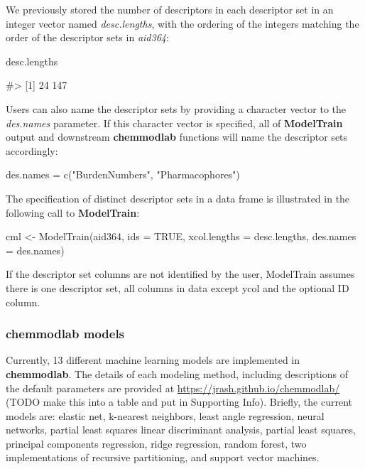 We previously stored the number of descriptors in each descriptor set in
an integer vector named \textit{desc.lengths}, with the ordering of the
integers matching the order of the descriptor sets in \textit{aid364}:

\begin{Schunk}
\begin{Sinput}
desc.lengths
\end{Sinput}
\begin{Soutput}
#> [1]  24 147
\end{Soutput}
\end{Schunk}

Users can also name the descriptor sets by providing a character vector
to the \textit{des.names} parameter. If this character vector is
specified, all of \textbf{ModelTrain} output and downstream
\textbf{chemmodlab} functions will name the descriptor sets accordingly:

\begin{Schunk}
\begin{Sinput}
des.names = c("BurdenNumbers", "Pharmacophores")
\end{Sinput}
\end{Schunk}

The specification of distinct descriptor sets in a data frame is
illustrated in the following call to \textbf{ModelTrain}:

\begin{Schunk}
\begin{Sinput}
cml <- ModelTrain(aid364, ids = TRUE, xcol.lengths = desc.lengths, 
                  des.names = des.names)
\end{Sinput}
\end{Schunk}

If the descriptor set columns are not identified by the user, ModelTrain
assumes there is one descriptor set, all columns in data except ycol and
the optional ID column.

\subsubsection{chemmodlab models}\label{chemmodlab-models}

Currently, 13 different machine learning models are implemented in
\textbf{chemmodlab}. The details of each modeling method, including
descriptions of the default parameters are provided at
\url{https://jrash.github.io/chemmodlab/} (TODO make this into a table
and put in Supporting Info). Briefly, the current models are: elastic
net, k-nearest neighbors, least angle regression, neural networks,
partial least squares linear discriminant analysis, partial least
squares, principal components regression, ridge regression, random
forest, two implementations of recursive partitioning, and support
vector machines.

